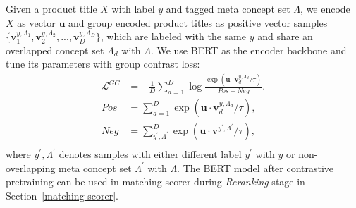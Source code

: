 Given a product title $X$ with label $y$ and tagged meta concept set $\Lambda$, we encode $X$ as vector $\mathbf{u}$ and group encoded product titles as positive vector samples 
$\{\mathbf{v}_1^{y,\Lambda_1}, \mathbf{v}_2^{y,\Lambda_2}, ..., \mathbf{v}_D^{y,\Lambda_D}\}$, which are labeled with the same $y$ and share an overlapped concept set $\Lambda_d$ with $\Lambda$. 
We use BERT as the encoder backbone and tune its parameters with group contrast loss: 
\begin{equation}
    \begin{aligned}
    \mathcal{L}^{GC}&=-\frac{1}{D}\sum_{d=1}^{D}{\log\frac{\exp(\mathbf{u}\cdot\mathbf{v}_d^{y,\Lambda_d}/\tau)}{Pos+Neg}}. \\
    Pos&=\sum_{d=1}^{D}{\exp(\mathbf{u}\cdot\mathbf{v}_d^{y,\Lambda_d}/\tau)}, \\
    Neg&=\sum_{y^{\prime},\Lambda^{\prime}}^D
    {\exp(\mathbf{u}\cdot\mathbf{v}^{y^{\prime},\Lambda^{\prime}}/\tau)},\\
    \end{aligned}
\end{equation}
where $y^{\prime},\Lambda^{\prime}$ denotes samples with either different label $y^{\prime}$ with $y$ or non-overlapping meta concept set $\Lambda^{\prime}$ with $\Lambda$. The BERT model after contrastive pretraining can be used in matching scorer during \textit{Reranking} stage in Section~\ref{matching-scorer}.


